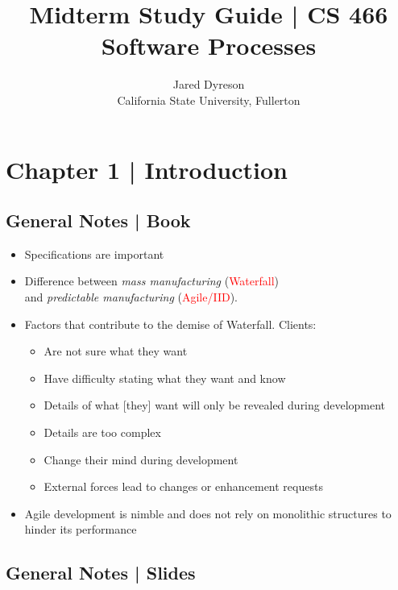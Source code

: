 \documentclass{article}
\title{Midterm Study Guide | CS 466 Software Processes}
\author{Jared Dyreson \\ 
        California State University, Fullerton}
\begin{document}
\maketitle
\tableofcontents

\newpage

\section{Chapter 1 | Introduction}

\subsection{General Notes | Book}

\begin{itemize}

\item Specifications are important
\item Difference between \emph{mass manufacturing} (\textcolor{red}{Waterfall}) \\ and \emph{predictable manufacturing} (\textcolor{red}{Agile/IID}).
\item Factors that contribute to the demise of Waterfall. Clients:

\begin{itemize}

\item Are not sure what they want
\item Have difficulty stating what they want and know
\item Details of what [they] want will only be revealed during development
\item Details are too complex
\item Change their mind during development
\item External forces lead to changes or enhancement requests

\end{itemize}
\item Agile development is nimble and does not rely on monolithic structures to hinder its performance

\end{itemize}


\subsection{General Notes | Slides}
\end{document}
